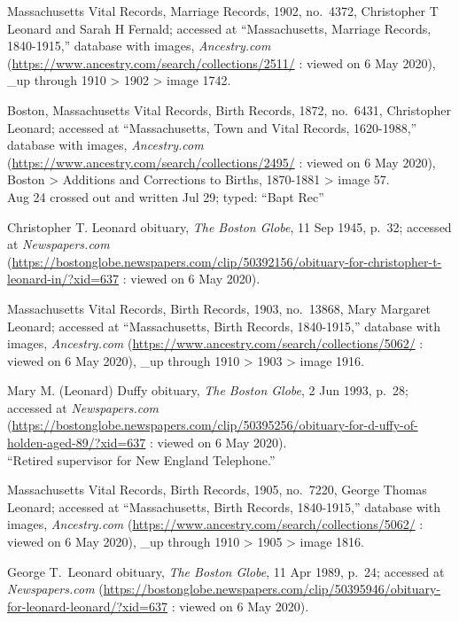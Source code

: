 \begin{thebibliography}{999}
	Massachusetts Vital Records, Marriage Records, 1902, no.\ 4372, Christopher T Leonard and Sarah H Fernald; accessed at ``Massachusetts, Marriage Records, 1840-1915,'' database with images, \textit{Ancestry.com} (\url{https://www.ancestry.com/search/collections/2511/} : viewed on 6 May 2020), \_up through 1910 > 1902 > image 1742.
	
	Boston, Massachusetts Vital Records, Birth Records, 1872, no.\ 6431, Christopher Leonard; accessed at ``Massachusetts, Town and Vital Records, 1620-1988,'' database with images, \textit{Ancestry.com} (\url{https://www.ancestry.com/search/collections/2495/} : viewed on 6 May 2020), Boston > Additions and Corrections to Births, 1870-1881 > image 57.\\
	Aug 24 crossed out and written Jul 29; typed: ``Bapt Rec''
	
	Christopher T. Leonard obituary, \textit{The Boston Globe}, 11 Sep 1945, p.\ 32; accessed at \textit{Newspapers.com} (\url{https://bostonglobe.newspapers.com/clip/50392156/obituary-for-christopher-t-leonard-in/?xid=637} : viewed on 6 May 2020).
	
	Massachusetts Vital Records, Birth Records, 1903, no.\ 13868, Mary Margaret Leonard; accessed at ``Massachusetts, Birth Records, 1840-1915,'' database with images, \textit{Ancestry.com} (\url{https://www.ancestry.com/search/collections/5062/} : viewed on 6 May 2020), \_up through 1910 > 1903 > image 1916.
	
	Mary M. (Leonard) Duffy obituary, \textit{The Boston Globe}, 2 Jun 1993, p.\ 28; accessed at \textit{Newspapers.com} (\url{https://bostonglobe.newspapers.com/clip/50395256/obituary-for-d-uffy-of-holden-aged-89/?xid=637} : viewed on 6 May 2020).\\
	``Retired supervisor for New England Telephone.''
	
	Massachusetts Vital Records, Birth Records, 1905, no.\ 7220, George Thomas Leonard; accessed at ``Massachusetts, Birth Records, 1840-1915,'' database with images, \textit{Ancestry.com} (\url{https://www.ancestry.com/search/collections/5062/} : viewed on 6 May 2020), \_up through 1910 > 1905 > image 1816.
	
	George T.\ Leonard obituary, \textit{The Boston Globe}, 11 Apr 1989, p.\ 24; accessed at \textit{Newspapers.com} (\url{https://bostonglobe.newspapers.com/clip/50395946/obituary-for-leonard-leonard/?xid=637} : viewed on 6 May 2020).
	

\end{thebibliography}
